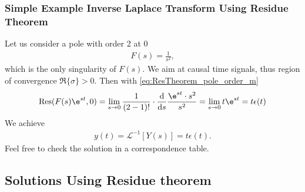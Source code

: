 \subsubsection{Simple Example Inverse Laplace Transform Using Residue Theorem}
Let us consider a pole with order 2 at $0$
\begin{align}
	F(s)=\frac{1}{s^2},
\end{align}
which is the only singularity of $F(s)$.
%
We aim at causal time signals, thus region of convergence $\Re\{\sigma\} > 0$.
%
Then with \eqref{eq:ResTheorem_pole_order_m}
\begin{align}
	\mathrm{Res}(F(s)\e^{st},0)=\lim\limits_{s\rightarrow0}\frac{1}{(2-1)!}\cdot\frac{\mathrm{d}}{\mathrm{d}s}\frac{\e^{st}\cdot s^2}{s^2}=\lim\limits_{s\rightarrow0}t\e^{st}=t \epsilon(t)
\end{align}
We achieve
\begin{align}
	y(t)=\mathcal{L}^{-1}[Y(s)]=t \epsilon(t).
\end{align}
Feel free to check the solution in a correspondence table.
\pagebreak
\subsection{Solutions Using Residue theorem}
